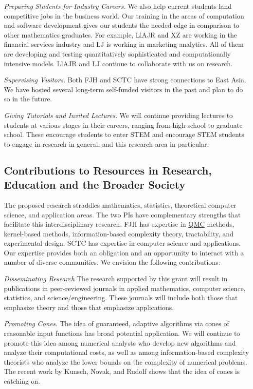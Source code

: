 \documentclass[11pt]{NSFamsart}
\newcommand{\QMC}{\hyperlink{QMClink}{QMC}\xspace}
\begin{document}
\emph{Preparing Students for Industry Careers.}
We also help current students land 
competitive jobs in the business world. Our training in the areas of computation and software 
development gives our students the needed edge in comparison to other mathematics 
graduates. For example, LlAJR and XZ are working in the financial services industry and  LJ is 
working in marketing analytics.  All of them are developing and testing quantitatively sophisticated 
and computationally intensive models.  LlAJR and LJ continue to collaborate with us on research.

\emph{Supervising Visitors.}
Both FJH and SCTC have strong connections to East Asia.  We have hosted several long-term 
self-funded visitors in the past and plan to do so in the future.

\emph{Giving Tutorials and Invited Lectures.}
We will continue providing lectures to students at various stages in their careers, ranging from high
school to graduate school. These encourage students to enter STEM and encourage STEM students 
to engage in research in general, and this research area in particular.


\subsection{Contributions to Resources in Research, Education and the Broader Society} 
\label{BroaderTwoSec}

The proposed research straddles mathematics, statistics, theoretical computer science, and 
application areas.  The two PIs have complementary strengths that facilitate this interdisciplinary research.  FJH 
has expertise in \QMC methods, kernel-based methods, information-based complexity 
theory, tractability, and experimental design. SCTC has expertise in computer science and applications.  Our 
expertise provides both an obligation and an opportunity to interact with a number of diverse 
communities. We envision the following contributions:

\emph{Disseminating Research}
The research supported by this grant will result in publications in peer-reviewed journals in applied
mathematics, computer science, statistics, and science/engineering. These 
journals will include both those that emphasize theory and those that emphasize applications.

\emph{Promoting Cones.} The idea of guaranteed, adaptive algorithms via cones of reasonable input 
functions has broad potential application.  We will continue to promote this idea among numerical analysts 
who 
develop new algorithms and analyze their computational costs, as well as among information-based 
complexity theorists who analyze the lower bounds on the complexity of numerical problems.  The recent work by Kunsch, Novak, and Rudolf \cite{KunEtal19a} shows that the idea of cones is catching on.
\end{document}
